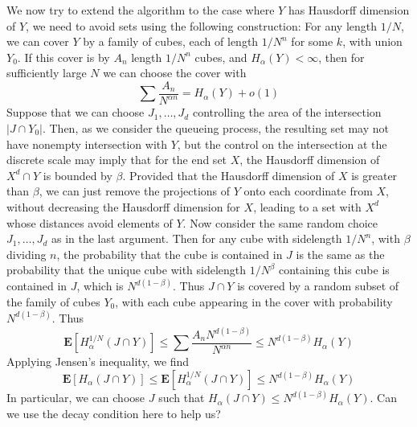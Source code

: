 \documentclass{report}
\theoremstyle{plain}
\theoremstyle{plain}
\begin{document}
We now try to extend the algorithm to the case where $Y$ has Hausdorff dimension of $Y$, we need to avoid sets using the following construction: For any length $1/N$, we can cover $Y$ by a family of cubes, each of length $1/N^n$ for some $k$, with union $Y_0$. If this cover is by $A_n$ length $1/N^n$ cubes, and $H_\alpha(Y) < \infty$, then for sufficiently large $N$ we can choose the cover with
%
\[ \sum \frac{A_n}{N^{\alpha n}} = H_\alpha(Y) + o(1) \]
%
Suppose that we can choose $J_1, \dots, J_d$ controlling the area of the intersection $|J \cap Y_0|$. Then, as we consider the queueing process, the resulting set may not have nonempty intersection with $Y$, but the control on the intersection at the discrete scale may imply that for the end set $X$, the Hausdorff dimension of $X^d \cap Y$ is bounded by $\beta$. Provided that the Hausdorff dimension of $X$ is greater than $\beta$, we can just remove the projections of $Y$ onto each coordinate from $X$, without decreasing the Hausdorff dimension for $X$, leading to a set with $X^d$ whose distances avoid elements of $Y$. Now consider the same random choice $J_1, \dots, J_d$ as in the last argument. Then for any cube with sidelength $1/N^n$, with $\beta$ dividing $n$, the probability that the cube is contained in $J$ is the same as the probability that the unique cube with sidelength $1/N^\beta$ containing this cube is contained in $J$, which is $N^{d(1 - \beta)}$. Thus $J \cap Y$ is covered by a random subset of the family of cubes $Y_0$, with each cube appearing in the cover with probability $N^{d(1 - \beta)}$. Thus
%
\[ \mathbf{E}[H_\alpha^{1/N}(J \cap Y)] \leq \sum \frac{A_n N^{d(1 - \beta)}}{N^{\alpha n}} \leq N^{d(1 - \beta)} H_\alpha(Y) \]
%
Applying Jensen's inequality, we find
%
\[ \mathbf{E}[H_\alpha(J \cap Y)] \leq \mathbf{E}[H_\alpha^{1/N}(J \cap Y)] \leq N^{d(1-\beta)} H_\alpha(Y) \]
%
In particular, we can choose $J$ such that $H_\alpha(J \cap Y) \leq N^{d(1-\beta)} H_\alpha(Y)$. Can we use the decay condition here to help us?
\end{document}
